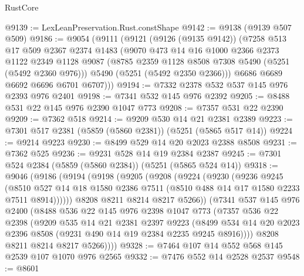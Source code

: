 \begin{lexlean}{RustCore}
\begin{coremodule}
@9139 := LexLeanPreservation.Rust.constShape
@9142 := @9138 (@9139 @507 @509)
@9186 := @9054
    (@9111
      (@9121
        (@9126 (@9135 @9142))
        (@7258
          @513
          @17
          @509
          @2367
          @2374
          @1483
          (@9070
            @473
            @14
            @16
            @1000
            @2366
            @2373
            @1122
            @2349
            @1128
            @9087
            (@8785 @2359 @1128 @8508 @7308 @5490 (@5251 (@5492 @2360 @976)))
            @5490
            (@5251 (@5492 @2350 @2366)))
          @6686
          @6689
          @6692
          @6696
          @6701
          @6707)))
@9194 := @7332 @2378 @532 @537 @145 @976 @2393 @976 @2401
@9198 := @7341 @532 @145 @976 @2392
@9205 := @8488 @531 @22 @145 @976 @2390 @1047 @773
@9208 := @7357 @531 @22 @2390
@9209 := @7362 @518
@9214 := @9209 @530 @14 @21 @2381 @2389
@9223 := @7301 @517 @2381 (@5859 (@5860 @2381)) (@5251 (@5865 @517 @14))
@9224 := @9214 @9223
@9230 := @8499 @529 @14 @20 @2023 @2388 @8508
@9231 := @7362 @525
@9236 := @9231 @528 @14 @19 @2384 @2387
@9245 := @7301 @524 @2384 (@5859 (@5860 @2384)) (@5251 (@5865 @524 @14))
@9318 := @9046
    (@9186
      (@9194
        (@9198
          (@9205
            (@9208
              (@9224
                (@9230
                  (@9236
                    @9245
                    (@8510
                      @527
                      @14
                      @18
                      @1580
                      @2386
                      @7511
                      (@8510 @488 @14 @17 @1580 @2233 @7511 @8914))))))
            @8208
            @8211
            @8214
            @8217
            @5266))
        (@7341
          @537
          @145
          @976
          @2400
          (@8488
            @536
            @22
            @145
            @976
            @2398
            @1047
            @773
            (@7357
              @536
              @22
              @2398
              (@9209
                @535
                @14
                @21
                @2381
                @2397
                @9223
                (@8499
                  @534
                  @14
                  @20
                  @2023
                  @2396
                  @8508
                  (@9231 @490 @14 @19 @2384 @2235 @9245 @8916))))
            @8208
            @8211
            @8214
            @8217
            @5266))))
@9328 := @7464 @107 @14 @552 @568 @145 @2539 @107 @1070 @976 @2565
@9332 := @7476 @552 @14 @2528 @2537
@9548 := @8601

\end{coremodule}
\end{lexlean}
